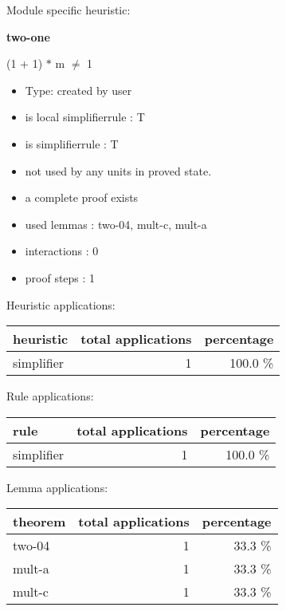 \documentclass[a4paper]{article}
\begin{document}
Module specific heuristic:

\pagebreak

{\LARGE\bf two-one}\label{lemma-two-one}

\medskip

 \Fol (1 + 1) $*$ m $\neq$ 1

\begin{itemize}

\item Type: created by user

\item is local simplifierrule : T
\item is simplifierrule : T
\item not used by any units in proved state.
\item       a complete proof exists
\item       used lemmas  : two-04, mult-c, mult-a
\item       interactions : 0
\item       proof steps  : 1
\end{itemize}

\medskip


Heuristic applications:

\begin{supertabular}{l|r|r}
heuristic	& total applications & percentage \\ \hline
simplifier & 1 & 100.0 \% \\

\end{supertabular}

Rule applications:

\begin{supertabular}{l|r|r}
rule	        & total applications & percentage \\ \hline
simplifier & 1 & 100.0 \% \\

\end{supertabular}

Lemma applications:

\begin{supertabular}{l|r|r}
theorem	        & total applications & percentage \\ \hline
two-04 & 1 & 33.3 \% \\
mult-a & 1 & 33.3 \% \\
mult-c & 1 & 33.3 \% \\

\end{supertabular}
\end{document}

